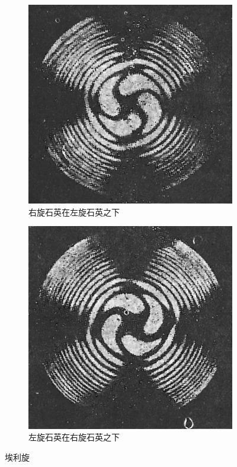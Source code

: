 \documentclass[11pt,a4paper]{article}
\begin{document}
\begin{spacing}{1.3}
\begin{CJK*}{UTF8}{gbsn}
\begin{figure}[h!]
\begin{subfigure}[b]{0.5\textwidth}
\includegraphics[width=\linewidth]{fig4-1-14a}
\caption{右旋石英在左旋石英之下}
\label{fig:4-1-14a}
\end{subfigure}
\begin{subfigure}[b]{0.49\textwidth}
\includegraphics[width=\linewidth]{fig4-1-14b}
\caption{左旋石英在右旋石英之下}
\label{fig:4-1-14b}
\end{subfigure}
\caption{埃利旋}\label{fig:4-1-14}
\end{figure} 

\end{CJK*}
\end{spacing}
\end{document}
